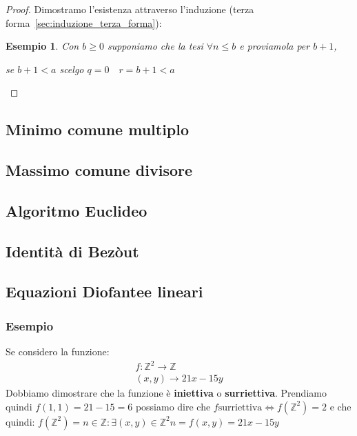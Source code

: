 \documentclass{article}
\newtheorem{exmp}{Esempio}[section]
\begin{document}
\begin{proof}
       Dimostramo l'esistenza attraverso l'induzione (terza forma~\ref{sec:induzione_terza_forma}):\newline
       \begin{exmp}
             Con $ b \ge 0 $ supponiamo che la tesi $ \forall n \le b   $  e proviamola per $ b + 1 $, \par
             se $ b + 1 < a$ scelgo $ q = 0 \quad r = b + 1 < a $  
       \end{exmp}  
\end{proof}




\subsection{Minimo comune multiplo}


\subsection{Massimo comune divisore}
\subsection{Algoritmo Euclideo}
\subsection{Identità di Bezòut}
\subsection{Equazioni Diofantee lineari}\label{sec:equazione_diofantea_lineare}

\subsubsection{Esempio}
Se considero la funzione:
\begin{align}
        f :  \mathbb{Z}^{2} \rightarrow \mathbb{Z} \\
        (x,y) \rightarrow 21x - 15y
\end{align}
Dobbiamo dimostrare che la funzione è \textbf{iniettiva} o \textbf{surriettiva}.
Prendiamo quindi $f(1,1) = 21 - 15 = 6$ possiamo dire che \newline
$f \textrm{surriettiva} \Leftrightarrow f(\mathbb{Z}^{2}) = 2$
e che quindi:
$f(\mathbb{Z}^{2}) = {n \in \mathbb{Z} : \exists(x,y) \in \mathbb{Z}^{2} n=f(x,y)=21x - 15y} $
\end{document}
